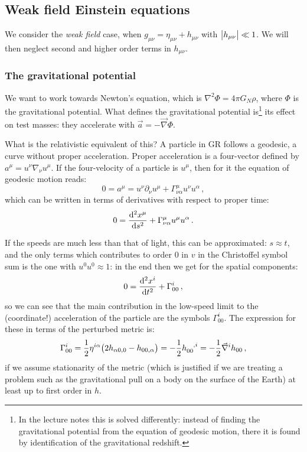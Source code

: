 \documentclass[main.tex]{subfiles}
\begin{document}
\subsection{Weak field Einstein equations}

We consider the \emph{weak field} case, when \(g_{\mu \nu }= \eta_{\mu \nu } + h_{\mu \nu }\) with \(\abs{h_{\mu \nu }} \ll 1 \). We will then neglect second and higher order terms in \(h_{\mu \nu }\).

\subsubsection{The gravitational potential}

We want to work towards Newton's equation, which is \(\nabla^2 \Phi = 4 \pi G_N \rho \), where \(\Phi \) is the gravitational potential.
What defines the gravitational potential is\footnote{In the lecture notes this is solved differently: instead of finding the gravitational potential from the equation of geodesic motion, there it is found by identification of the gravitational redshift.} its effect on test masses: they accelerate with \(\vec{a} = - \vec{\nabla} \Phi \).

What is the relativistic equivalent of this?
A particle in GR follows a geodesic, a curve without proper acceleration.
Proper acceleration is a four-vector defined by \(a^{\mu }=u^{\nu }\nabla_{\nu } u^{\mu }\). If the four-velocity of a particle is \(u^{\mu }\), then for it the equation of geodesic motion reads: 
%
\begin{equation}
  0 = a^{\mu }= u^{\nu }\partial_{\nu }u^{\mu } + \Gamma^{\mu }_{\nu \alpha }u^{\nu} u^{\alpha }
\,,
\end{equation}
%
which can be written in terms of derivatives with respect to proper time: 
%
\begin{equation}
  0 = \dv[2]{x^{ \mu }}{s} + \Gamma^{\mu }_{\nu \alpha } u^{\mu } u^{\alpha }
\,.
\end{equation}

If the speeds are much less than that of light, this can be approximated: \(s \approx t\), and the only terms which contributes to order 0 in \(v\) in the Christoffel symbol sum is the one with \(u^{0} u^{0}\approx 1\): in the end then we get for the spatial components: 
%
\begin{equation}
  0 = \dv[2]{x^{i}}{t} + \Gamma^{i}_{00}
\,,
\end{equation}
%
so we can see that the main contribution in the low-speed limit to the (coordinate!) acceleration of the particle are the symbols \(\Gamma^{i}_{00}\).
The expression for these in terms of the perturbed metric is: 
%
\begin{equation} \label{eq:weak-field-Christoffel}
  \Gamma^{i}_{00} 
  = \frac{1}{2} \eta^{i \alpha } \qty(2 h_{\alpha 0, 0} - h_{00, \alpha }) 
  = -\frac{1}{2} \tensor{h}{_{00}^{,i}}= -\frac{1}{2} \vec{\nabla}^{i} h_{00}
\,,
\end{equation}
%
if we assume stationarity of the metric (which is justified if we are treating a problem such as the gravitational pull on a body on the surface of the Earth) at least up to first order in \(h\).
\end{document}
